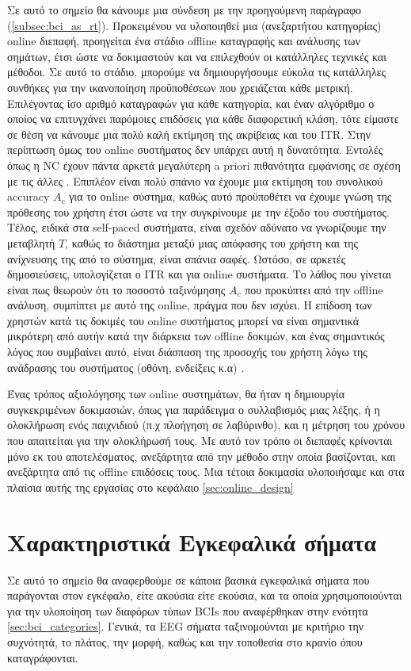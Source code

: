 \documentclass[11pt,a4paper,english,greek,twoside]{../Thesis}
\begin{document}
  \par Σε αυτό το σημείο θα κάνουμε μια σύνδεση με την προηγούμενη παράγραφο (\ref{subsec:bci_as_rt}). Προκειμένου να υλοποιηθεί μια (ανεξαρτήτου κατηγορίας) online διεπαφή, προηγείται ένα στάδιο offline καταγραφής και ανάλυσης των σημάτων, έτσι ώστε να δοκιμαστούν και να επιλεχθούν οι κατάλληλες τεχνικές και μέθοδοι. Σε αυτό το στάδιο, μπορούμε να δημιουργήσουμε εύκολα τις κατάλληλες συνθήκες για την ικανοποίηση προϋποθέσεων που χρειάζεται κάθε μετρική. Επιλέγοντας ίσο αριθμό καταγραφών για κάθε κατηγορία, και έναν αλγόριθμο ο οποίος να επιτυγχάνει παρόμοιες επιδόσεις για κάθε διαφορετική κλάση, τότε είμαστε σε θέση να κάνουμε μια πολύ καλή εκτίμηση της ακρίβειας και του ITR. Στην περίπτωση όμως του online συστήματος δεν υπάρχει αυτή η δυνατότητα. Εντολές όπως η NC έχουν πάντα αρκετά  μεγαλύτερη a priori πιθανότητα εμφάνισης σε σχέση με τις άλλες \cite{Mason2006-ts}. Επιπλέον είναι πολύ σπάνιο να έχουμε μια εκτίμηση του συνολικού accuracy $A_c$ για το οnline σύστημα, καθώς αυτό προϋποθέτει να έχουμε γνώση της πρόθεσης του χρήστη έτσι ώστε να την συγκρίνουμε με την έξοδο του συστήματος. Τέλος, ειδικά στα self-paced συστήματα, είναι σχεδόν αδύνατο να γνωρίζουμε την μεταβλητή $T$, καθώς το διάστημα μεταξύ μιας απόφασης του χρήστη και της ανίχνευσης της από το σύστημα, είναι σπάνια σαφές. Ωστόσο, σε αρκετές δημοσιεύσεις, υπολογίζεται ο ITR και για οnline συστήματα. Το λάθος που γίνεται είναι πως θεωρούν ότι το ποσοστό ταξινόμησης $A_c$ που προκύπτει από την offline ανάλυση, συμπίπτει με αυτό της online, πράγμα που δεν ισχύει. Η επίδοση των χρηστών κατά τις δοκιμές του online συστήματος μπορεί να είναι σημαντικά μικρότερη από αυτήν κατά την διάρκεια των offline δοκιμών, και ένας σημαντικός λόγος που συμβαίνει αυτό, είναι διάσπαση της προσοχής του χρήστη λόγω της ανάδρασης του συστήματος (οθόνη, ενδείξεις κ.α)\cite{Muller-Putz2006-wj} \cite{Yuan2013-jp}.
  \par Ένας τρόπος αξιολόγησης των online συστημάτων, θα ήταν η δημιουργία συγκεκριμένων δοκιμασιών, όπως για παράδειγμα ο συλλαβισμός μιας λέξης, ή η ολοκλήρωση ενός παιχνιδιού (π.χ πλοήγηση σε λαβύρινθο), και η μέτρηση του χρόνου που απαιτείται για την ολοκλήρωσή τους. Με αυτό τον τρόπο οι διεπαφές κρίνονται μόνο εκ του αποτελέσματος, ανεξάρτητα από την μέθοδο στην οποία βασίζονται, και ανεξάρτητα από τις offline επιδόσεις τους. Μια τέτοια δοκιμασία υλοποιήσαμε και στα πλαίσια αυτής της εργασίας στο κεφάλαιο \ref{sec:online_design}

\section{Χαρακτηριστικά Εγκεφαλικά σήματα}
  \par Σε αυτό το σημείο θα αναφερθούμε σε κάποια βασικά εγκεφαλικά σήματα που παράγονται στον εγκέφαλο, είτε ακούσια είτε εκούσια, και τα οποία χρησιμοποιούνται για την υλοποίηση των διαφόρων τύπων BCIs που αναφέρθηκαν στην ενότητα \ref{sec:bci_categories}. Γενικά, τα EEG σήματα ταξινομούνται με κριτήριο την συχνότητά, το πλάτος, την μορφή, καθώς και την τοποθεσία στο κρανίο όπου καταγράφονται.
  
\end{document}
